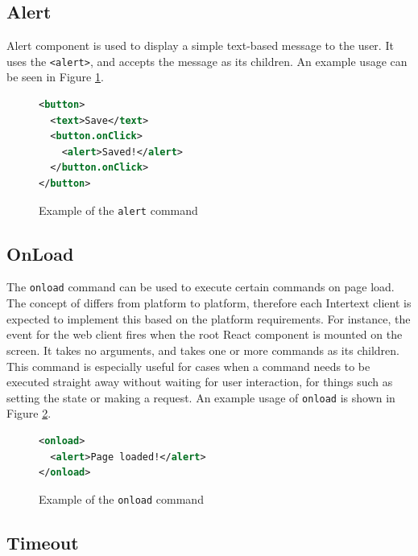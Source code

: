 \subsection{Alert}

Alert component is used to display a simple text-based message to the user. It uses the \texttt{<alert>}, and accepts the message as its children. An example usage can be seen in Figure \ref{fig:alert_command_usage}.

\begin{figure}
\begin{minipage}{\linewidth}
\begin{lstlisting}[language=xml]
<button>
  <text>Save</text>
  <button.onClick>
    <alert>Saved!</alert>
  </button.onClick>
</button>
\end{lstlisting}
\end{minipage}
\caption{Example of the \texttt{alert} command}%
\label{fig:alert_command_usage}%
\end{figure}

\subsection{OnLoad}

The \texttt{onload} command can be used to execute certain commands on page load. The concept of  differs from platform to platform, therefore each Intertext client is expected to implement this based on the platform requirements. For instance, the  event for the web client fires when the root React component is mounted on the screen. It takes no arguments, and takes one or more commands as its children. This command is especially useful for cases when a command needs to be executed straight away without waiting for user interaction, for things such as setting the state or making a request. An example usage of \texttt{onload} is shown in Figure \ref{fig:onload_usage}.

\begin{figure}
\begin{minipage}{\linewidth}
\begin{lstlisting}[language=xml]
<onload>
  <alert>Page loaded!</alert>
</onload>
\end{lstlisting}
\end{minipage}
\caption{Example of the \texttt{onload} command}%
\label{fig:onload_usage}%
\end{figure}

\subsection{Timeout}


